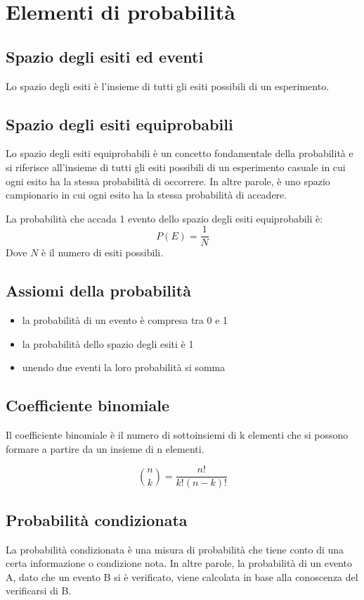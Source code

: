 \chapter{Elementi di probabilità}
\section{Spazio degli esiti ed eventi}

Lo spazio degli esiti è l'insieme di tutti gli esiti possibili di un esperimento.

\section{Spazio degli esiti equiprobabili}
Lo spazio degli esiti equiprobabili è un concetto fondamentale della probabilità e si riferisce all'insieme di tutti gli esiti possibili di un esperimento casuale in cui ogni esito ha la stessa probabilità di occorrere. In altre parole, è uno spazio campionario in cui ogni esito ha la stessa probabilità di accadere.


La probabilità che accada 1 evento dello spazio degli esiti equiprobabili è:
\begin{equation}
  P(E) = \frac{1}{N}
\end{equation}
Dove $N$ è il numero di esiti possibili.
\section{Assiomi della probabilità}

\begin{itemize}
  \item la probabilità di un evento è compresa tra 0 e 1
  \item la probabilità dello spazio degli esiti è 1
  \item unendo due eventi la loro probabilità si somma
\end{itemize}


\section{Coefficiente binomiale}
Il coefficiente binomiale è il numero di sottoinsiemi di k elementi che si possono formare a partire da un insieme di n elementi.

\begin{equation}
  \binom{n}{k} = \frac{n!}{k!(n-k)!}
\end{equation}

\section{Probabilità condizionata}
La probabilità condizionata è una misura di probabilità che tiene conto di una certa informazione o condizione nota. In altre parole, la probabilità di un evento A, dato che un evento B si è verificato, viene calcolata in base alla conoscenza del verificarsi di B.

